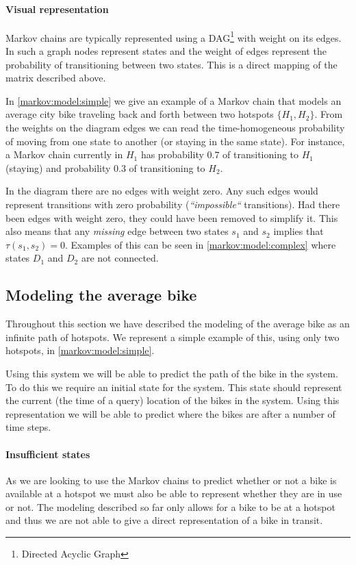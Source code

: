 \paragraph{Visual representation}
Markov chains are typically represented using a DAG\footnote{Directed Acyclic Graph} with weight on its edges.
In such a graph nodes represent states and the weight of edges represent the probability of transitioning between two states.
This is a direct mapping of the matrix described above.

In \cref{markov:model:simple} we give an example of a Markov chain that models an average city bike traveling back and forth between two hotspots $\{H_1, H_2\}$.
From the weights on the diagram edges we can read the time-homogeneous probability of moving from one state to another (or staying in the same state).
For instance, a Markov chain currently in $H_1$ has probability $0.7$ of transitioning to $H_1$ (staying) and probability $0.3$ of transitioning to $H_2$.

In the diagram there are no edges with weight zero.
Any such edges would represent transitions with zero probability (\textit{``impossible``} transitions).
Had there been edges with weight zero, they could have been removed to simplify it.
This also means that any \textit{missing} edge between two states $s_1$ and $s_2$ implies that $\tau(s_1, s_2) = 0$.
Examples of this can be seen in \cref{markov:model:complex} where states $D_1$ and $D_2$ are not connected.

\subsection{Modeling the average bike}\label{markov:modeling}
Throughout this section we have described the modeling of the average bike as an infinite path of hotspots.
We represent a simple example of this, using only two hotspots, in \cref{markov:model:simple}.

Using this system we will be able to predict the path of the bike in the system.
To do this we require an initial state for the system.
This state should represent the current (the time of a query) location of the bikes in the system.
Using this representation we will be able to predict where the bikes are after a number of time steps.

\paragraph{Insufficient states}
As we are looking to use the Markov chains to predict whether or not a bike is available at a hotspot we must also be able to represent whether they are in use or not.
The modeling described so far only allows for a bike to be at a hotspot and thus we are not able to give a direct representation of a bike in transit.

